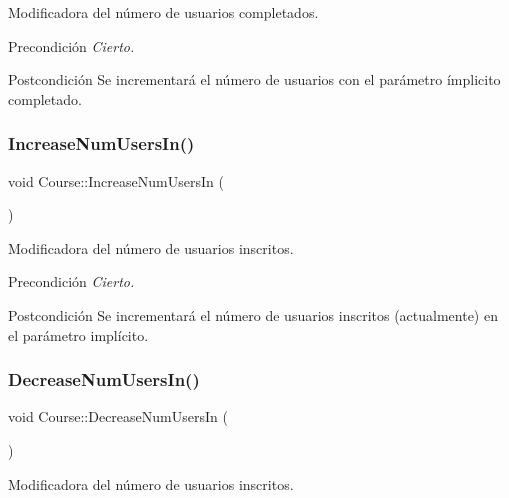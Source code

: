 Modificadora del número de usuarios completados. 

\begin{DoxyPrecond}{Precondición}
{\itshape Cierto.} 
\end{DoxyPrecond}
\begin{DoxyPostcond}{Postcondición}
Se incrementará el número de usuarios con el parámetro ímplicito completado. 
\end{DoxyPostcond}
\mbox{\label{class_course_ab1bf31a23895b7ece77ab0c74a4de321}} 
\subsubsection{\texorpdfstring{Increase\+Num\+Users\+In()}{IncreaseNumUsersIn()}}
{\footnotesize\ttfamily void Course\+::\+Increase\+Num\+Users\+In (\begin{DoxyParamCaption}{ }\end{DoxyParamCaption})}



Modificadora del número de usuarios inscritos. 

\begin{DoxyPrecond}{Precondición}
{\itshape Cierto.} 
\end{DoxyPrecond}
\begin{DoxyPostcond}{Postcondición}
Se incrementará el número de usuarios inscritos (actualmente) en el parámetro implícito. 
\end{DoxyPostcond}
\mbox{\label{class_course_ab23d9a5201da47a27d9b307a5889ca23}} 
\subsubsection{\texorpdfstring{Decrease\+Num\+Users\+In()}{DecreaseNumUsersIn()}}
{\footnotesize\ttfamily void Course\+::\+Decrease\+Num\+Users\+In (\begin{DoxyParamCaption}{ }\end{DoxyParamCaption})}



Modificadora del número de usuarios inscritos. 

